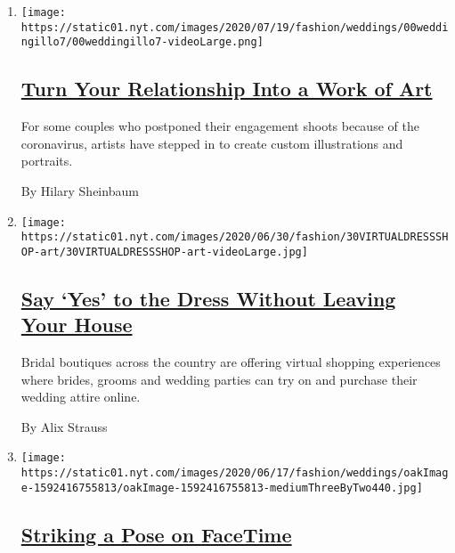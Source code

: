 \begin{enumerate}
\def\labelenumi{\arabic{enumi}.}
\item
  \texttt{[image: https://static01.nyt.com/images/2020/07/19/fashion/weddings/00weddingillo7/00weddingillo7-videoLarge.png]}

  \hypertarget{turn-your-relationship-into-a-work-of-art}{%
  \subsection{\texorpdfstring{\href{/2020/07/15/fashion/weddings/turn-your-relationship-into-a-work-of-art.html}{Turn
  Your Relationship Into a Work of
  Art}}{Turn Your Relationship Into a Work of Art}}\label{turn-your-relationship-into-a-work-of-art}}

  For some couples who postponed their engagement shoots because of the
  coronavirus, artists have stepped in to create custom illustrations
  and portraits.

  By Hilary Sheinbaum
\item
  \texttt{[image: https://static01.nyt.com/images/2020/06/30/fashion/30VIRTUALDRESSSHOP-art/30VIRTUALDRESSSHOP-art-videoLarge.jpg]}

  \hypertarget{say-yes-to-the-dress-without-leaving-your-house}{%
  \subsection{\texorpdfstring{\href{/2020/06/30/fashion/weddings/say-yes-to-the-dress-without-leaving-your-house.html}{Say
  `Yes' to the Dress Without Leaving Your
  House}}{Say `Yes' to the Dress Without Leaving Your House}}\label{say-yes-to-the-dress-without-leaving-your-house}}

  Bridal boutiques across the country are offering virtual shopping
  experiences where brides, grooms and wedding parties can try on and
  purchase their wedding attire online.

  By Alix Strauss
\item
  \texttt{[image: https://static01.nyt.com/images/2020/06/17/fashion/weddings/oakImage-1592416755813/oakImage-1592416755813-mediumThreeByTwo440.jpg]}

  \hypertarget{striking-a-pose-on-facetime}{%
  \subsection{\texorpdfstring{\href{/2020/06/18/fashion/weddings/striking-a-pose-on-facetime.html}{Striking
  a Pose on
  FaceTime}}{Striking a Pose on FaceTime}}\label{striking-a-pose-on-facetime}}


\end{enumerate}
